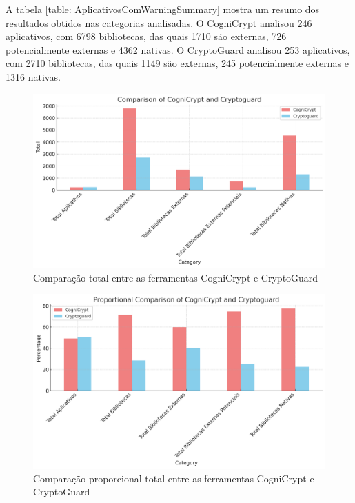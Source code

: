 A tabela \ref{table: AplicativosComWarningSummary} mostra um resumo dos resultados obtidos nas categorias analisadas. O CogniCrypt analisou 246 aplicativos, com 6798 bibliotecas, das quais 1710 são externas, 726 potencialmente externas e 4362 nativas. O CryptoGuard analisou 253 aplicativos, com 2710 bibliotecas, das quais 1149 são externas, 245 potencialmente externas e 1316 nativas.

\begin{figure}[!ht]
  \centering
  \includegraphics[scale=0.5]{img/plot_cc_x_cg_summary.png}
  \caption{Comparação total entre as ferramentas CogniCrypt e CryptoGuard}
  \label{img: CCvsCG_Summary}
\end{figure}

\FloatBarrier

\begin{figure}[!ht]
  \centering
  \includegraphics[scale=0.5]{img/plot_cc_x_cg_proportion_summary.png}
  \caption{Comparação proporcional total entre as ferramentas CogniCrypt e CryptoGuard}
  \label{img: CCvsCG_Summary2}
\end{figure}

